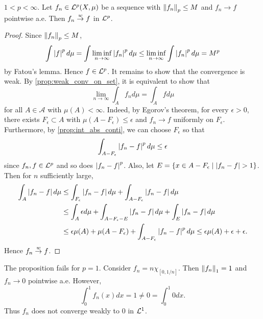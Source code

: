 \begin{proposition}
    $1<p<\infty$. Let $f_n\in\mathcal{L}^p(X,\mu)$ be a sequence with 
    $\left\lVert {f_n} \right\rVert_p\leq M$ and $f_n\to f$ pointwise a.e. Then 
    $f_n\overset{w}{\to} f$ in $\mathcal{L}^p$.
\end{proposition}
\begin{proof}
    Since $\left\lVert {f_n} \right\rVert_p\leq M$, 
    \begin{equation*}
        \int \left\lvert {f} \right\rvert^pd\mu = \int \liminf_{n\to\infty}\left\lvert {f_n} \right\rvert^pd\mu 
        \leq \liminf_{n\to\infty}\int \left\lvert {f_n} \right\rvert^pd\mu = M^p
    \end{equation*}
    by Fatou's lemma. Hence $f\in\mathcal{L}^p$. It remains to show that 
    the convergence is weak. By \cref{prop:weak_conv_on_set}, it is equivalent 
    to show that
    \begin{equation*}
        \lim_{n\to\infty}\int_A f_nd\mu = \int_A fd\mu
    \end{equation*}
    for all $A\in\mathcal{A}$ with $\mu(A)<\infty$. Indeed, by Egorov's
    theorem, for every $\epsilon>0$, there exists $F_\epsilon\subset A$ with 
    $\mu(A-F_\epsilon)\leq\epsilon$ and $f_n\to f$ uniformly on $F_\epsilon$. 
    Furthermore, by \cref{prop:int_abs_conti}, we can choose $F_\epsilon$ so 
    that 
    \begin{equation*}
        \int_{A-F_\epsilon} \left\lvert {f_n-f} \right\rvert^pd\mu \leq \epsilon
    \end{equation*}
    since $f_n,f\in\mathcal{L}^p$ and so does $\left\lvert {f_n-f} \right\rvert^p$. Also, let 
    $E = \left\{ x\in A-F_\epsilon \;\middle\vert\; \left\lvert {f_n-f} \right\rvert>1 \right\}$. Then for $n$ 
    sufficiently large,
    \begin{equation*}
        \begin{split}
            \int_A \left\lvert {f_n-f} \right\rvert d\mu 
            &\leq \int_{F_\epsilon} \left\lvert {f_n-f} \right\rvert d\mu + \int_{A-F_\epsilon} \left\lvert {f_n-f} \right\rvert d\mu \\
            &\leq \int_A \epsilon d\mu + \int_{A-F_\epsilon-E} \left\lvert {f_n-f} \right\rvert d\mu + \int_E \left\lvert {f_n-f} \right\rvert d\mu \\
            &\leq \epsilon\mu(A) + \mu(A-F_\epsilon) + \int_{A-F_\epsilon} \left\lvert {f_n-f} \right\rvert^pd\mu 
            \leq \epsilon\mu(A) + \epsilon + \epsilon.
        \end{split}
    \end{equation*}
    Hence $f_n\overset{w}{\to} f$.
\end{proof}

\begin{remark}
    The proposition fails for $p=1$. Consider $f_n = n\chi_{[0,1/n]}$. 
    Then $\left\lVert {f_n} \right\rVert_1 = 1$ and $f_n\to 0$ pointwise a.e. However, 
    \begin{equation*}
        \int_0^1 f_n(x)dx = 1 \neq 0 = \int_0^1 0dx.
    \end{equation*}
    Thus $f_n$ does not converge weakly to $0$ in $\mathcal{L}^1$.
\end{remark}

